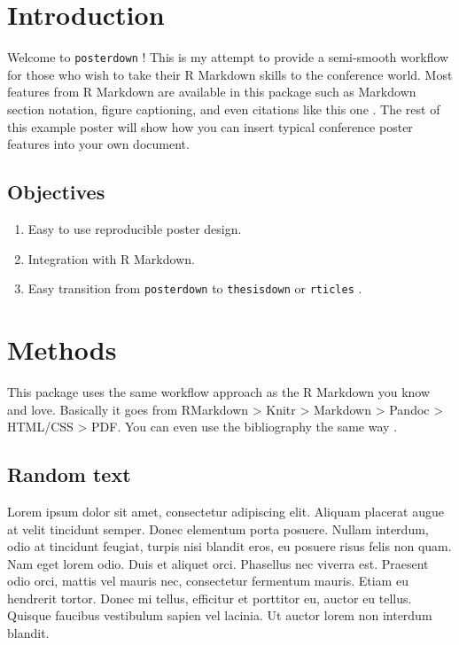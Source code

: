 \documentclass[article,30pt,extrafontsizes]{memoir}
\begin{document}
\begin{adjmulticols*}{2}{0.5in}{0.5in}
\normalsize{  %
\color{bodytextcol}
\hypertarget{introduction}{%
\section{Introduction}\label{introduction}}

Welcome to \texttt{posterdown} ! This is my attempt to provide a
semi-smooth workflow for those who wish to take their R Markdown skills
to the conference world. Most features from R Markdown are available in
this package such as Markdown section notation, figure captioning, and
even citations like this one \autocite{rmarkdown}. The rest of this
example poster will show how you can insert typical conference poster
features into your own document.

\hypertarget{objectives}{%
\subsection{Objectives}\label{objectives}}

\begin{enumerate}
\def\labelenumi{\arabic{enumi}.}
\tightlist
\item
  Easy to use reproducible poster design.
\item
  Integration with R Markdown.
\item
  Easy transition from \texttt{posterdown} to \texttt{thesisdown} or
  \texttt{rticles} \autocites{rticles}{thesisdown}.
\end{enumerate}

\hypertarget{methods}{%
\section{Methods}\label{methods}}

This package uses the same workflow approach as the R Markdown you know
and love. Basically it goes from RMarkdown \textgreater{} Knitr
\textgreater{} Markdown \textgreater{} Pandoc \textgreater{} HTML/CSS
\textgreater{} PDF. You can even use the bibliography the same way
\autocite{turnerControlsWaterBalance2014}.

\hypertarget{random-text}{%
\subsection{Random text}\label{random-text}}

Lorem ipsum dolor sit amet, consectetur adipiscing elit. Aliquam
placerat augue at velit tincidunt semper. Donec elementum porta posuere.
Nullam interdum, odio at tincidunt feugiat, turpis nisi blandit eros, eu
posuere risus felis non quam. Nam eget lorem odio. Duis et aliquet orci.
Phasellus nec viverra est. Praesent odio orci, mattis vel mauris nec,
consectetur fermentum mauris. Etiam eu hendrerit tortor. Donec mi
tellus, efficitur et porttitor eu, auctor eu tellus. Quisque faucibus
vestibulum sapien vel lacinia. Ut auctor lorem non interdum blandit.

}
\end{adjmulticols*}
\end{document}
